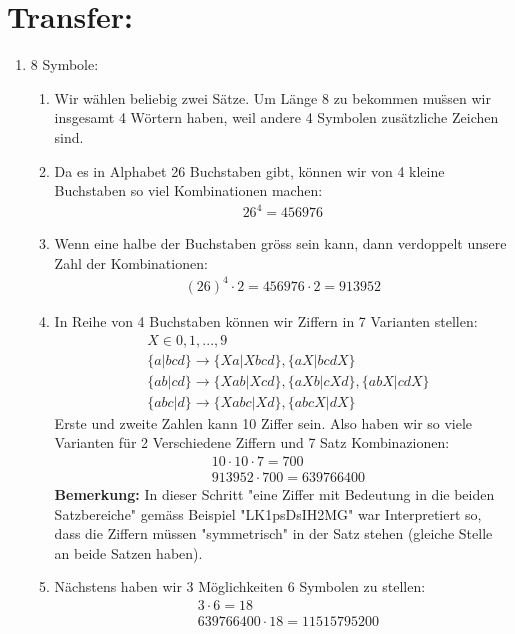 	\section*{Transfer:}
	\begin{enumerate}[label=(\alph*)]
		\item 8 Symbole:
		\begin{enumerate}[label=\bfseries Schritt \arabic*:]
			\item Wir w\"ahlen beliebig zwei S\"atze. Um L\"ange 8 zu bekommen mu\"ssen wir insgesamt 4 W\"ortern haben,
			weil andere 4 Symbolen zus\"atzliche Zeichen sind.

			\item Da es in Alphabet 26 Buchstaben gibt, k\"onnen wir von 4 kleine Buchstaben so viel Kombinationen machen:
			\begin{align*}
				26^4=456976
			\end{align*}

			\item Wenn eine halbe der Buchstaben gr\"oss sein kann, dann verdoppelt unsere Zahl der Kombinationen:
			\begin{align*}
				(26)^4\cdot2=456976\cdot2=913952
			\end{align*}

			\item In Reihe von 4 Buchstaben k\"onnen wir Ziffern in 7 Varianten stellen:
			\begin{align*}
				& X \in {0,1,...,9} \\
				& \{a|bcd\} \to \{Xa|Xbcd\},\{aX|bcdX\} \\
				& \{ab|cd\} \to \{Xab|Xcd\},\{aXb|cXd\}, \{abX|cdX\} \\
				& \{abc|d\} \to \{Xabc|Xd\},\{abcX|dX\}
			\end{align*}
			Erste und zweite Zahlen kann 10 Ziffer sein. Also haben wir so viele Varianten f\"ur 2 Verschiedene 
			Ziffern und 7 Satz Kombinazionen:
			\begin{align*}
				& 10\cdot10\cdot7 = 700 \\
				& 913952\cdot700 = 639766400
			\end{align*}
			\textbf{Bemerkung:} In dieser Schritt "eine Ziffer mit Bedeutung in die beiden Satzbereiche" gem\"ass 
			Beispiel "LK1psDsIH2MG" war Interpretiert so, dass die Ziffern m\"ussen "symmetrisch" in der Satz stehen
			(gleiche Stelle an beide Satzen haben). 
			\item N\"achstens haben wir 3 M\"oglichkeiten 6 Symbolen zu stellen:
			\begin{align*}
				& 3\cdot6=18 \\
				& 639766400\cdot18 = 11515795200
			\end{align*}


\end{enumerate}
\end{enumerate}
